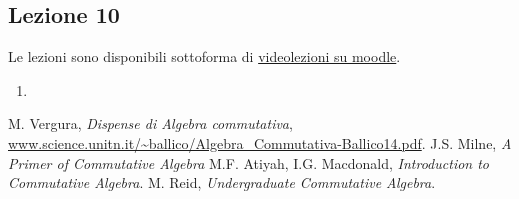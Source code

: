 \documentclass[italian]{article}
\begin{document}
    \subsection{Lezione 10}

    Le lezioni sono disponibili sottoforma di 
    \href{https://didatticaonline.unitn.it/dol/course/view.php?id=23268}{videolezioni
    su moodle}.
    
    \begin{enumerate}
      \item 
    \end{enumerate}   


    \begin{thebibliography}{9}
       M. Vergura, \textit{Dispense di Algebra commutativa},
        \url{www.science.unitn.it/~ballico/Algebra_Commutativa-Ballico14.pdf}.
       J.S. Milne, \textit{A Primer of Commutative Algebra}
       M.F. Atiyah, I.G. Macdonald, \textit{Introduction to 
            Commutative Algebra}.
       M. Reid, \textit{Undergraduate Commutative Algebra}.
    \end{thebibliography}
\end{document}
